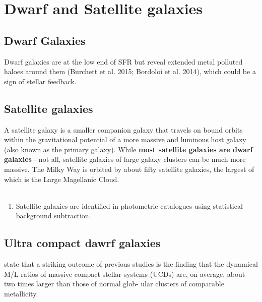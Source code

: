 \chapter{Dwarf and Satellite galaxies}

\section{Dwarf Galaxies}

Dwarf galaxies are at the low end of SFR but reveal extended metal polluted haloes around them (Burchett et al. 2015; Bordoloi et al. 2014), which could be a sign of stellar feedback. 


\section{Satellite galaxies}

A satellite galaxy is a smaller companion galaxy that travels on bound orbits within the gravitational potential of a more massive and luminous host galaxy (also known as the primary galaxy). While \textbf{most satellite galaxies are dwarf galaxies} - not all, satellite galaxies of large galaxy clusters can be much more massive. The Milky Way is orbited by about fifty satellite galaxies, the largest of which is the Large Magellanic Cloud.\\
\\
\begin{enumerate}
    \item Satellite galaxies are identified in photometric catalogues using statistical background subtraction.
\end{enumerate}


\section{Ultra compact dawrf galaxies} \label{UCDs}

\cite{2008Mieske} state that a striking outcome of previous studies is the finding that the dynamical M/L ratios of massive compact stellar systems (UCDs) are, on average, about two times larger than those of normal glob- ular clusters of comparable metallicity.